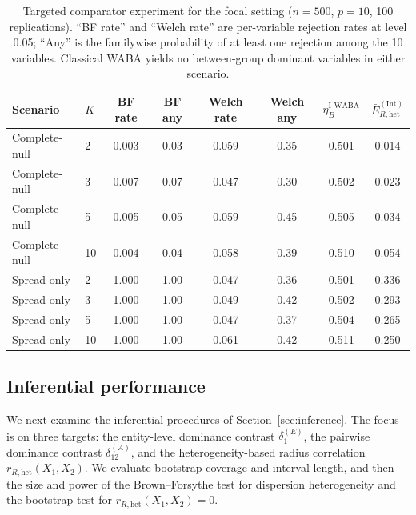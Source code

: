 \documentclass[preprint, times, 12pt, authoryear]{elsarticle}
\begin{document}
\begin{table}[ht]
	\centering
	\caption{Targeted comparator experiment for the focal setting ($n=500$, $p=10$, 100 replications). ``BF rate'' and ``Welch rate'' are per-variable rejection rates at level 0.05; ``Any'' is the familywise probability of at least one rejection among the 10 variables. Classical WABA yields no between-group dominant variables in either scenario.}
	\label{tab:sim_comparator}
	\begin{tabular}{llcccccc}
		\toprule
		Scenario & $K$ & BF rate & BF any & Welch rate & Welch any & $\bar\eta_B^{\mathrm{I\text{-}WABA}}$ & $\bar E_{R,\mathrm{het}}^{(\mathrm{Int})}$ \\
		\midrule
		Complete-null & 2  & 0.003 & 0.03 & 0.059 & 0.35 & 0.501 & 0.014 \\
		Complete-null & 3  & 0.007 & 0.07 & 0.047 & 0.30 & 0.502 & 0.023 \\
		Complete-null & 5  & 0.005 & 0.05 & 0.059 & 0.45 & 0.505 & 0.034 \\
		Complete-null & 10 & 0.004 & 0.04 & 0.058 & 0.39 & 0.510 & 0.054 \\
		\midrule
		Spread-only   & 2  & 1.000 & 1.00 & 0.047 & 0.36 & 0.501 & 0.336 \\
		Spread-only   & 3  & 1.000 & 1.00 & 0.049 & 0.42 & 0.502 & 0.293 \\
		Spread-only   & 5  & 1.000 & 1.00 & 0.047 & 0.37 & 0.504 & 0.265 \\
		Spread-only   & 10 & 1.000 & 1.00 & 0.061 & 0.42 & 0.511 & 0.250 \\
		\bottomrule
	\end{tabular}
\end{table}

\subsection{Inferential performance}\label{sec:sim_inference}

We next examine the inferential procedures of Section~\ref{sec:inference}. The focus is on three targets: the entity-level dominance contrast $\delta_1^{(E)}$, the pairwise dominance contrast $\delta_{12}^{(A)}$, and the heterogeneity-based radius correlation $r_{R,\mathrm{het}}(X_1,X_2)$. We evaluate bootstrap coverage and interval length, and then the size and power of the Brown--Forsythe test for dispersion heterogeneity and the bootstrap test for $r_{R,\mathrm{het}}(X_1,X_2)=0$.
\end{document}
